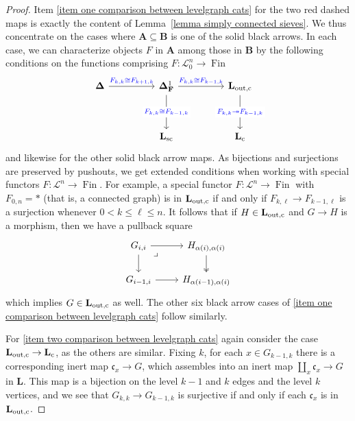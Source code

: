 \documentclass{amsart}
\numberwithin{theorem}{subsection}
\theoremstyle{definition}
\newcommand{\finset}{\operatorname{Fin}}
\newcommand{\finsetskel}{\mathbf{F}}
\newcommand{\xfc}{\mathfrak{c}}
\newcommand{\name}[1]{\ensuremath{\text{\textup{#1}}}}
\newcommand{\simp}{\mathbf{\Delta}}
\newcommand{\levelg}{\mathbf{L}}
\newcommand{\levelgconn}{\levelg_{\name{c}}}
\newcommand{\scriptyell}{\mathscr L}
\begin{document}
\begin{proof}
Item \eqref{item one comparison between levelgraph cats} for the two {\color{red} red dashed} maps is exactly the content of Lemma~\ref{lemma simply connected sieves}.
We thus concentrate on the cases where $\mathbf{A} \subseteq \mathbf{B}$ is one of the solid black arrows. 
In each case, we can characterize objects $F$ in $\mathbf{A}$ among those in $\mathbf{B}$ by the following conditions on the functions comprising $F\colon \scriptyell^{n}_0 \to \finset$
\[ \begin{tikzcd}[sep=huge]
\simp \rar["\color{blue}F_{k,k} \cong F_{k+1,k}"] & \simp_\finsetskel^1 \rar["\color{blue}F_{k,k} \cong F_{k-1,k}"] \dar["\color{blue}F_{k,k} \cong F_{k-1,k}" description] & \levelg_{\name{out,c}} \dar["\color{blue}F_{k,k} \twoheadrightarrow F_{k-1,k}" description]  \\
& \levelg_{\name{sc}} & \levelgconn
\end{tikzcd} \]
and likewise for the other solid black arrow maps.
As bijections and surjections are preserved by pushouts, we get extended conditions when working with special functors $F\colon \scriptyell^{n} \to \finset$.
For example, a special functor $F\colon \scriptyell^{n} \to \finset$ with $F_{0,n} = \ast$ (that is, a connected graph) is in $\levelg_{\name{out,c}}$ if and only if $F_{k,\ell} \to F_{k-1, \ell}$ is a surjection whenever $0 < k \leq \ell \leq n$.
It follows that if $H\in \levelg_{\name{out,c}}$ and $G\to H$ is a morphism, then we have a pullback square
		\begin{equation*}
		\begin{tikzcd}
		G_{i,i}\ar[r] \dar  \arrow[dr, phantom, "\lrcorner", very near start] & H_{\alpha(i),\alpha(i)} \dar[two heads] \\
		G_{i-1,i}\ar[r] & H_{\alpha(i-1),\alpha(i)}
		\end{tikzcd}
		\end{equation*}
which implies $G \in \levelg_{\name{out,c}}$ as well.
The other six black arrow cases of \eqref{item one comparison between levelgraph cats} follow similarly.

For \eqref{item two comparison between levelgraph cats} again consider the case $\levelg_{\name{out,c}} \to \levelgconn$, as the others are similar.
Fixing $k$, for each $x \in G_{k-1,k}$ there is a corresponding inert map $\xfc_x \to G$, which assembles into an inert map $\coprod_x \xfc_x \to G$ in $\levelg$.
This map is a bijection on the level $k-1$ and $k$ edges and the level $k$ vertices, and we see that $G_{k,k} \to G_{k-1,k}$ is surjective if and only if each $\xfc_x$ is in $\levelg_{\name{out,c}}$.
\end{proof}
\end{document}
